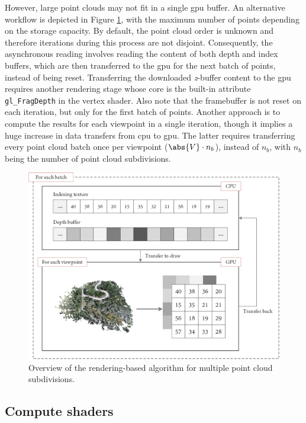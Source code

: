 However, large point clouds may not fit in a single \acrshort{gpu} buffer. An alternative workflow is depicted in Figure \ref{fig:occlusion_opengl_zbuffer_multiple_batches}, with the maximum number of points depending on the storage capacity. By default, the point cloud order is unknown and therefore iterations during this process are not disjoint. Consequently, the asynchronous reading involves reading the content of both depth and index buffers, which are then transferred to the \acrshort{gpu} for the next batch of points, instead of being reset. Transferring the downloaded \textit{z}-buffer content to the \acrshort{gpu} requires another rendering stage whose core is the built-in attribute \verb|gl_FragDepth| in the vertex shader. Also note that the framebuffer is not reset on each iteration, but only for the first batch of points. Another approach is to compute the results for each viewpoint in a single iteration, though it implies a huge increase in data transfers from \acrshort{cpu} to \acrshort{gpu}. The latter requires transferring every point cloud batch once per viewpoint ($\abs{V} \cdot n_{b}$), instead of $n_{b}$, with $n_{b}$ being the number of point cloud subdivisions.

\begin{figure}[htb]
    \centering
    \includegraphics[width=\linewidth]{figs/multi_thermal_projection/multiple_batches_opengl_gpu.png}
    \caption{Overview of the rendering-based algorithm for multiple point cloud subdivisions.}
    \label{fig:occlusion_opengl_zbuffer_multiple_batches}
\end{figure}

\subsection{Compute shaders}

